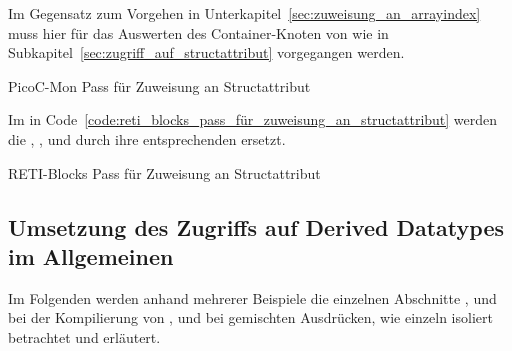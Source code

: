 Im Gegensatz zum Vorgehen in Unterkapitel~\ref{sec:zuweisung_an_arrayindex} muss hier für das Auswerten des  Container-Knoten  von  wie in Subkapitel~\ref{sec:zugriff_auf_structattribut} vorgegangen werden.

\begin{code}
  \centering
  \caption{PicoC-Mon Pass für Zuweisung an Structattribut}
  \label{code:picoc_mon_pass_für_zuweisung_an_structattribut}
\end{code}

Im  in Code~\ref{code:reti_blocks_pass_für_zuweisung_an_structattribut} werden die  , ,  und  durch ihre entsprechenden  ersetzt.

\begin{code}
  \centering
  \caption{RETI-Blocks Pass für Zuweisung an Structattribut}
  \label{code:reti_blocks_pass_für_zuweisung_an_structattribut}
\end{code}

\subsection{Umsetzung des Zugriffs auf Derived Datatypes im Allgemeinen}

Im Folgenden werden anhand mehrerer Beispiele die einzelnen Abschnitte ,  und  bei der Kompilierung von ,  und  bei gemischten Ausdrücken, wie  einzeln isoliert betrachtet und erläutert.


